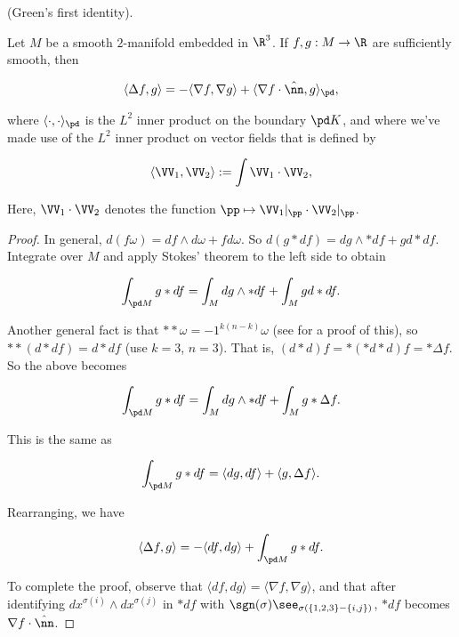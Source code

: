 \begin{lemma}
\label{ch::ddg::lemma:green_first_identity}
    (Green's first identity).
    
    Let $M$ be a smooth $2$-manifold embedded in $\R^3$. If $f, g:M \rightarrow \R$ are sufficiently smooth, then
    
    \begin{align*}
        \langle \Delta f, g \rangle = -\langle \nabla f, \nabla g \rangle + \langle \nabla f \cdot \hat{\nn}, g \rangle_\pd,
    \end{align*}
    
    where $\langle \cdot, \cdot \rangle_\pd$ is the $L^2$ inner product on the boundary $\pd K$, and where we've made use of the $L^2$ inner product on vector fields that is defined by
    
    \begin{align*}
        \langle \VV_1, \VV_2 \rangle := \int \VV_1 \cdot \VV_2,
    \end{align*}
    
    Here, $\VV_1 \cdot \VV_2$ denotes the function $\pp \mapsto \VV_1|_\pp \cdot \VV_2|_\pp$.
\end{lemma}

\begin{proof}
    In general, $d(f\omega) = df \wedge d\omega + fd\omega$. So $d(g * df) = dg \wedge *df + gd*df$. Integrate over $M$ and apply Stokes' theorem to the left side to obtain
    
    \begin{align*}
        \int_{\pd M} g * df = \int_M dg \wedge *df + \int_M g d*df.
    \end{align*}
    
    Another general fact is that $**\omega = -1^{k(n-k)} \omega$ (see \cite{HodgeStar} for a proof of this), so $**(d*df) = d*df$ (use $k = 3$, $n = 3$). That is, $(d*d)f = *(*d*d)f = * \Delta f$. So the above becomes
    
    \begin{align*}
        \int_{\pd M} g * df =  \int_M dg \wedge *df + \int_M g *\Delta f.
    \end{align*}
    
    This is the same as
    
    \begin{align*}
        \int_{\pd M} g*df = \langle dg, df \rangle + \langle g, \Delta f \rangle.
    \end{align*}
    
    Rearranging, we have
    
    \begin{align*}
        \langle \Delta f, g \rangle = - \langle df, dg \rangle + \int_{\pd M} g*df.
    \end{align*}
    
    To complete the proof, observe that $\langle df, dg \rangle = \langle \nabla f, \nabla g \rangle$, and that after identifying $dx^{\sigma(i)} \wedge dx^{\sigma(j)}$ in $*df$ with $\sgn(\sigma) \see_{\sigma(\{1, 2, 3\} - \{i, j\})}$, $*df$ becomes $\nabla f \cdot \hat{\nn}$.
\end{proof}

